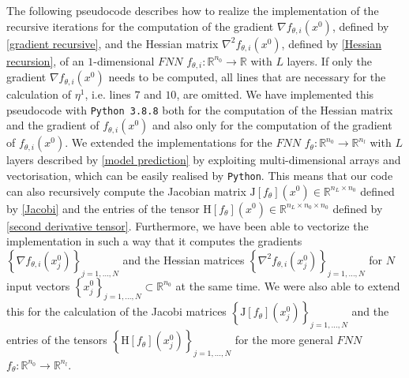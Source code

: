 The following pseudocode describes how to realize the implementation of the recursive iterations for the computation of the gradient $\nabla f_{\theta, i} \left(x^0\right)$, defined by \cref{gradient recursive}, and the Hessian matrix $\nabla^{2} f_{\theta, i} \left(x^0\right)$, defined by \cref{Hessian recursion}, of an $1$-dimensional $FNN$ $f_{\theta, i} \colon \mathbb{R}^{n_0} \to \mathbb{R}$ with $L$ layers. If only the gradient $\nabla f_{\theta, i} \left(x^0\right)$ needs to be computed, all lines that are necessary for the calculation of $\eta^1$, i.e. lines $7$ and $10$, are omitted. We have implemented this pseudocode with \lstinline!Python 3.8.8! both for the computation of the Hessian matrix and the gradient of $f_{\theta, i} \left(x^0\right)$ and also only for the computation of the gradient of $f_{\theta, i} \left(x^0\right)$. We extended the implementations for the $FNN$ $f_{\theta} \colon \mathbb{R}^{n_0} \to \mathbb{R}^{n_l}$ with $L$ layers described by \cref{model prediction} by exploiting multi-dimensional arrays and vectorisation, which can be easily realised by \lstinline!Python!. This means that our code can also recursively compute the Jacobian matrix $\mathrm{J} \left[f_{\theta} \right]\left(x^0\right) \in \mathbb{R}^{n_L \times n_0}$ defined by \cref{Jacobi} and the entries of the tensor $\mathrm{H} \left[f_{\theta} \right]\left(x^0\right) \in \mathbb{R}^{n_L \times n_0 \times n_0}$ defined by \cref{second derivative tensor}. Furthermore, we have been able to vectorize the implementation in such a way that it computes the gradients $\left\{ \nabla f_{\theta, i} \left(x^0_j \right) \right\}_{j=1,\ldots,N}$ and the Hessian matrices $\left\{ \nabla^2 f_{\theta, i} \left(x^0_j \right) \right\}_{j=1,\ldots,N}$ for $N$ input vectors $\left\{ x^0_j \right\}_{j=1,\ldots,N} \subset \mathbb{R}^{n_0}$ at the same time. We were also able to extend this for the calculation of the Jacobi matrices $\left\{ \mathrm{J} \left[f_{\theta} \right]\left( x^0_j \right) \right\}_{j=1,\ldots,N}$ and the entries of the tensors $\left\{ \mathrm{H} \left[f_{\theta} \right]\left(x^0_j\right) \right\}_{j=1,\ldots,N}$ for the more general $FNN$ $f_{\theta} \colon \mathbb{R}^{n_0} \to \mathbb{R}^{n_l}$. 

